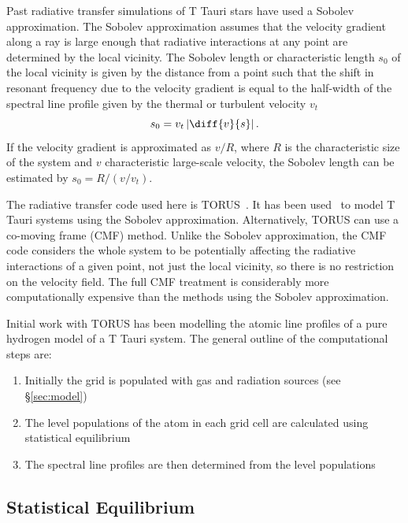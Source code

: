 \documentclass[fleqn,usenatbib]{mnras}
\begin{document}
Past radiative transfer simulations of T Tauri stars have used a Sobolev approximation. The Sobolev approximation assumes that the velocity gradient along a ray is large enough that radiative interactions at any point are determined by the local vicinity. The Sobolev length  or characteristic length $s_0$ of the local vicinity is given by the distance from a point such that the shift in resonant frequency due to the velocity gradient is equal to the half-width of the spectral line profile given by the thermal or turbulent velocity $v_t$
\begin{equation}
    s_0 = v_t \left|\diff{v}{s}\right|{\rm .}
    \label{eq:sobolevlength}
\end{equation}
If the velocity gradient is approximated as $v/R$, where $R$ is the characteristic size of the system and $v$ characteristic large-scale velocity, the Sobolev length can be estimated by $s_0 = R/(v/v_t)$.

The radiative transfer code used here is TORUS~\citep{2019A&C....27...63H}. It has been used~\citep[e.g.][]{2005MNRAS.356.1489S} to model T Tauri systems using the Sobolev approximation. Alternatively, TORUS can use a co-moving frame (CMF) method. Unlike the Sobolev approximation, the CMF code considers the whole system to be potentially affecting the radiative interactions of a given point, not just the local vicinity, so there is no restriction on the velocity field. The full CMF treatment is considerably more computationally expensive than the methods using the Sobolev approximation.

Initial work with TORUS has been modelling the atomic line profiles of a pure hydrogen model of a T Tauri system. The general outline of the computational steps are:
\begin{enumerate}
    \item Initially the grid is populated with gas and radiation sources (see \S\ref{sec:model})
    \item The level populations of the atom in each grid cell are calculated using statistical equilibrium 
    \item The spectral line profiles are then determined from the level populations
\end{enumerate}


\subsection{Statistical Equilibrium}
\label{sec:statistical}
\end{document}
